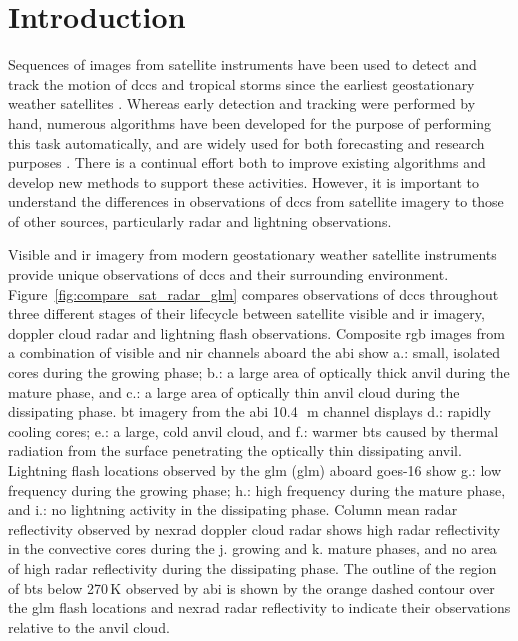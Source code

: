 
\section{Introduction} %


Sequences of images from satellite instruments have been used to detect and track the motion of \acrshort{dcc}s and tropical storms since the earliest geostationary weather satellites \citep{menzel_cloud_2001}.
Whereas early detection and tracking were performed by hand, numerous algorithms have been developed for the purpose of performing this task automatically, and are widely used for both forecasting and research purposes \citep[e.g.][]{mecikalski_use_2011, senf_characterization_2015, senf_satellite-based_2017, feng_life_2012, feng_spatiotemporal_2019, zinner_cb-tram:_2008}.
There is a continual effort both to improve existing algorithms and develop new methods to support these activities.
However, it is important to understand the differences in observations of \acrshort{dcc}s from satellite imagery to those of other sources, particularly radar and lightning observations.

Visible and \acrshort{ir} imagery from modern geostationary weather satellite instruments provide unique observations of \acrshort{dcc}s and their surrounding environment.
Figure~\ref{fig:compare_sat_radar_glm} compares observations of \acrshort{dcc}s throughout three different stages of their lifecycle between satellite visible and \acrshort{ir} imagery, doppler cloud radar and lightning flash observations.
Composite \acrshort{rgb} images from a combination of visible and \acrshort{nir} channels aboard the \acrshort{abi} show a.: small, isolated cores during the growing phase; b.: a large area of optically thick anvil during the mature phase, and c.: a large area of optically thin anvil cloud during the dissipating phase.
\acrshort{bt} imagery from the \acrshort{abi} 10.4\,\unit{\mu m} channel displays d.: rapidly cooling cores; e.: a large, cold anvil cloud, and f.: warmer \acrshort{bt}s caused by thermal radiation from the surface penetrating the optically thin dissipating anvil. 
Lightning flash locations observed by the \acrshort{glm} (\acrshort{glm}) aboard \acrshort{goes}-16 show g.: low frequency during the growing phase; h.: high frequency during the mature phase, and i.: no lightning activity in the dissipating phase. 
Column mean radar reflectivity observed by \acrshort{nexrad} doppler cloud radar shows high radar reflectivity in the convective cores during the j. growing and k. mature phases, and no area of high radar reflectivity during the dissipating phase. 
The outline of the region of \acrshort{bt}s below 270\,\unit{K} observed by \acrshort{abi} is shown by the orange dashed contour over the \acrshort{glm} flash locations and \acrshort{nexrad} radar reflectivity to indicate their observations relative to the anvil cloud.


